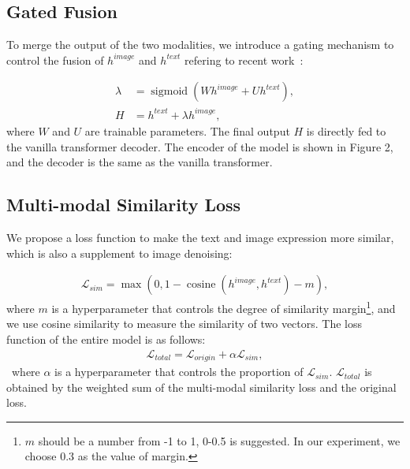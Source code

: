 \documentclass[11pt]{article}
\begin{document}
\subsection{Gated Fusion}

To merge the output of the two modalities,  we introduce a gating mechanism to control the fusion of $ h ^ {{image}} $ and $ h ^ {{text}} $ refering to recent work~\citep{DBLP:conf/iclr/0001C0USLZ20}:

\begin{equation}
\begin{aligned}
{\lambda}&=\operatorname{sigmoid}\left({W}h ^ {{image}} + {U}h^ {{text}}\right), \\
H&=h^{{text}} + {\lambda}h^{{image}},
\end{aligned}
\end{equation}
where $W$ and $U$ are trainable parameters. The final output $H$ is directly fed to the vanilla transformer decoder.
The encoder of the model is shown in Figure 2, and the decoder is the same as the vanilla transformer.



\subsection{Multi-modal Similarity Loss}
We propose a loss function to make the text and image expression more similar, which is also a supplement to image denoising:


\begin{equation}
\begin{aligned}
 \mathcal{L}_{sim} = \operatorname{max}(0, 1-\operatorname{cosine}(h ^ {{image}}, h ^ {{text}})-m),
\end{aligned}
\end{equation}
where ${m}$ is a hyperparameter that controls the degree of similarity margin\footnote{${m}$ should be a number from -1 to 1, 0-0.5 is suggested. In our experiment, we choose 0.3 as the value of margin.}, and we use cosine similarity to measure the similarity of two vectors. The loss function of the entire model is as follows:
\begin{equation}
\begin{aligned}
 \mathcal{L}_{total} =  \mathcal{L}_{origin} + {\alpha}\mathcal{L}_{sim},
\end{aligned}
\end{equation}\
where ${\alpha}$ is a hyperparameter that controls the proportion of $\mathcal{L}_{sim}$.
$\mathcal{L}_{total}$ is obtained by the weighted sum of the multi-modal similarity loss and the original loss.
\end{document}
